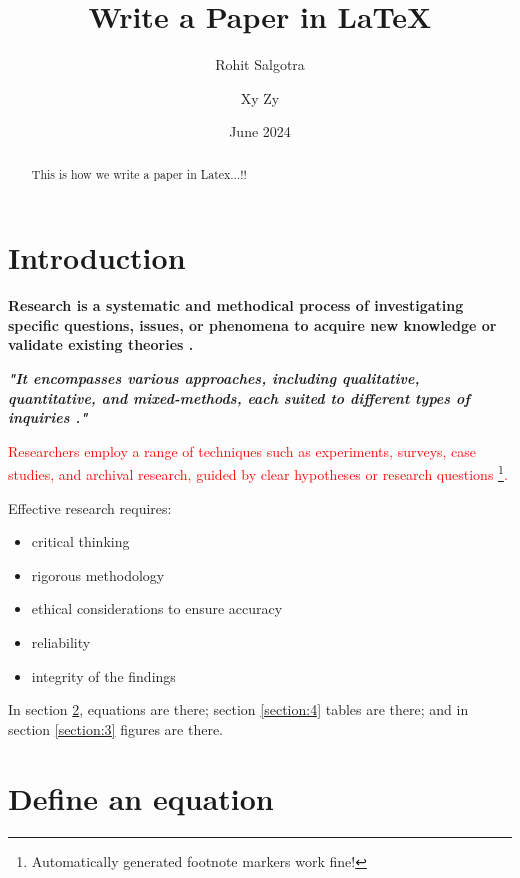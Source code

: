\documentclass[review]{elsarticle}
\begin{document}
\title{Write a Paper in LaTeX}
\author[1]{Rohit Salgotra}
\address[1]{Dept. of LaTeX Studies}
\date{June 2024}

\author[2]{Xy Zy}
\address[2]{Dept. of Not Studying At All}
\begin{abstract}
 This is how we write a paper in Latex...!!
\end{abstract}
\maketitle

\section{Introduction}


\textbf{Research is a systematic and methodical process of investigating specific questions, issues, or phenomena to acquire new knowledge or validate existing theories \cite{das2010differential}.}


\textbf{\textit{"It encompasses various approaches, including qualitative, quantitative, and mixed-methods, each suited to different types of inquiries \cite{salgotranaked}." }}


\textcolor{red}{Researchers employ a range of techniques such as experiments, surveys, case studies, and archival research, guided by clear hypotheses or research questions \footnote{Automatically generated footnote markers work fine!}. }


Effective research requires:
\begin{itemize}
    \item critical thinking
    \item rigorous methodology
    \item ethical considerations to ensure accuracy
    \item reliability
    \item integrity of the findings
\end{itemize}

In section \ref{section:2}, equations are there; section \ref{section:4} tables are there; and in section \ref{section:3} figures are there.


\section{Define an equation} \label{section:2}
\end{document}
